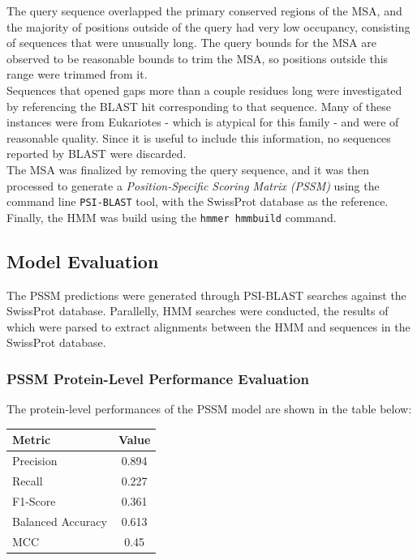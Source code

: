 \documentclass[10pt,twocolumn,letterpaper]{article}
\begin{document}
The query sequence overlapped the primary conserved regions of the MSA, and the majority of positions outside of the query had very low occupancy, consisting of sequences that were unusually long. The query bounds for the MSA are observed to be reasonable bounds to trim the MSA, so positions outside this range were trimmed from it. \\

Sequences that opened gaps more than a couple residues long were investigated by referencing the BLAST hit corresponding to that sequence. Many of these instances were from Eukariotes - which is atypical for this family - and were of reasonable quality. Since it is useful to include this information, no sequences reported by BLAST were discarded. \\

The MSA was finalized by removing the query sequence, and it was then processed to generate a \textit{Position-Specific Scoring Matrix (PSSM)} using the command line \texttt{PSI-BLAST} tool, with the SwissProt database as the reference. Finally, the HMM was build using the \texttt{hmmer hmmbuild} command.

\subsection{Model Evaluation}

The PSSM predictions were generated through PSI-BLAST searches against the SwissProt database.
Parallelly, HMM searches were conducted, the results of which were parsed to extract alignments between the HMM and sequences in the SwissProt database.

\subsubsection{PSSM Protein-Level Performance Evaluation}

The protein-level performances of the PSSM model are shown in the table below:

\begin{center}
    \begin{tabular}{lc}
        \toprule
        Metric & Value \\
        \midrule
        Precision & 0.894 \\
        Recall & 0.227 \\
        F1-Score & 0.361 \\
        Balanced Accuracy & 0.613 \\
        MCC & 0.45 \\
        \bottomrule
    \end{tabular}
\end{center} \\ 
\end{document}
